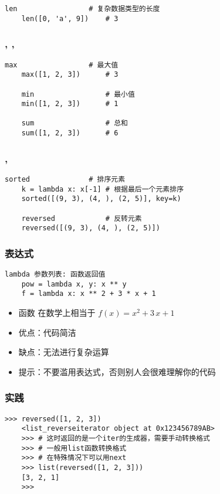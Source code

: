 \begin{CJK}{UTF8}{gbsn}
\begin{frame} [fragile]
\begin{lstlisting}[style=pythonstyle, gobble=4, texcl]
	len					# 复杂数据类型的长度
	len([0, 'a', 9])	# 3
	\end{lstlisting}
\end{frame}

\begin{frame} [fragile]
	\frametitle{, , }
	\linespread{1.5}
	\begin{lstlisting}[style=pythonstyle, gobble=4, texcl]
	max					# 最大值
	max([1, 2, 3])		# 3

	min					# 最小值
	min([1, 2, 3])		# 1

	sum					# 总和
	sum([1, 2, 3])		# 6
	\end{lstlisting}
\end{frame}

\begin{frame} [fragile]
	\frametitle{, }
	\linespread{1.5}
	\begin{lstlisting}[style=pythonstyle, gobble=4, texcl]
	sorted				# 排序元素
	k = lambda x: x[-1]	# 根据最后一个元素排序
	sorted([(9, 3), (4, ), (2, 5)], key=k)

	reversed			# 反转元素
	reversed([(9, 3), (4, ), (2, 5)])
	\end{lstlisting}
\end{frame}

\begin{frame} [fragile]
	\frametitle{表达式}
	\linespread{1.5}
	\begin{lstlisting}[style=pythonstyle, gobble=4, texcl]
	lambda 参数列表: 函数返回值
	pow = lambda x, y: x ** y
	f = lambda x: x ** 2 + 3 * x + 1
	\end{lstlisting}
	\begin{itemize}
	\item 函数  在数学上相当于 $f(x) = x^2 + 3\,x + 1$
	\item 优点：代码简洁
	\item 缺点：无法进行复杂运算
	\item 提示：不要滥用表达式，否则别人会很难理解你的代码
	\end{itemize}
\end{frame}

\begin{frame} [fragile]
	\frametitle{实践}
	\linespread{1.25}
	\begin{lstlisting}[style=pythonstyle, gobble=4, texcl]
	>>> reversed([1, 2, 3])
	<list_reverseiterator object at 0x123456789AB>
	>>> # 这时返回的是一个iter的生成器，需要手动转换格式
	>>> # 一般用list函数转换格式
	>>> # 在特殊情况下可以用next
	>>> list(reversed([1, 2, 3]))
	[3, 2, 1]
	>>> 
	\end{lstlisting}
\end{frame}


\end{CJK}
